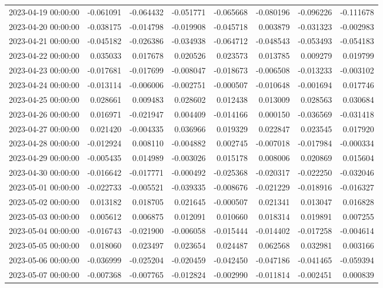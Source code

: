 \begin{tabular}{lrrrrrrr}
2023-04-19 00:00:00 & -0.061091 & -0.064432 & -0.051771 & -0.065668 & -0.080196 & -0.096226 & -0.111678 \\
2023-04-20 00:00:00 & -0.038175 & -0.014798 & -0.019908 & -0.045718 & 0.003879 & -0.031323 & -0.002983 \\
2023-04-21 00:00:00 & -0.045182 & -0.026386 & -0.034938 & -0.064712 & -0.048543 & -0.053493 & -0.054183 \\
2023-04-22 00:00:00 & 0.035033 & 0.017678 & 0.020526 & 0.023573 & 0.013785 & 0.009279 & 0.019799 \\
2023-04-23 00:00:00 & -0.017681 & -0.017699 & -0.008047 & -0.018673 & -0.006508 & -0.013233 & -0.003102 \\
2023-04-24 00:00:00 & -0.013114 & -0.006006 & -0.002751 & -0.000507 & -0.010648 & -0.001694 & 0.017746 \\
2023-04-25 00:00:00 & 0.028661 & 0.009483 & 0.028602 & 0.012438 & 0.013009 & 0.028563 & 0.030684 \\
2023-04-26 00:00:00 & 0.016971 & -0.021947 & 0.004409 & -0.014166 & 0.000150 & -0.036569 & -0.031418 \\
2023-04-27 00:00:00 & 0.021420 & -0.004335 & 0.036966 & 0.019329 & 0.022847 & 0.023545 & 0.017920 \\
2023-04-28 00:00:00 & -0.012924 & 0.008110 & -0.004882 & 0.002745 & -0.007018 & -0.017984 & -0.000334 \\
2023-04-29 00:00:00 & -0.005435 & 0.014989 & -0.003026 & 0.015178 & 0.008006 & 0.020869 & 0.015604 \\
2023-04-30 00:00:00 & -0.016642 & -0.017771 & -0.000492 & -0.025368 & -0.020317 & -0.022250 & -0.032046 \\
2023-05-01 00:00:00 & -0.022733 & -0.005521 & -0.039335 & -0.008676 & -0.021229 & -0.018916 & -0.016327 \\
2023-05-02 00:00:00 & 0.013182 & 0.018705 & 0.021645 & -0.000507 & 0.021341 & 0.013047 & 0.016828 \\
2023-05-03 00:00:00 & 0.005612 & 0.006875 & 0.012091 & 0.010660 & 0.018314 & 0.019891 & 0.007255 \\
2023-05-04 00:00:00 & -0.016743 & -0.021900 & -0.006058 & -0.015444 & -0.014402 & -0.017258 & -0.004614 \\
2023-05-05 00:00:00 & 0.018060 & 0.023497 & 0.023654 & 0.024487 & 0.062568 & 0.032981 & 0.003166 \\
2023-05-06 00:00:00 & -0.036999 & -0.025204 & -0.020459 & -0.042450 & -0.047186 & -0.041465 & -0.059394 \\
2023-05-07 00:00:00 & -0.007368 & -0.007765 & -0.012824 & -0.002990 & -0.011814 & -0.002451 & 0.000839 \\

\end{tabular}
